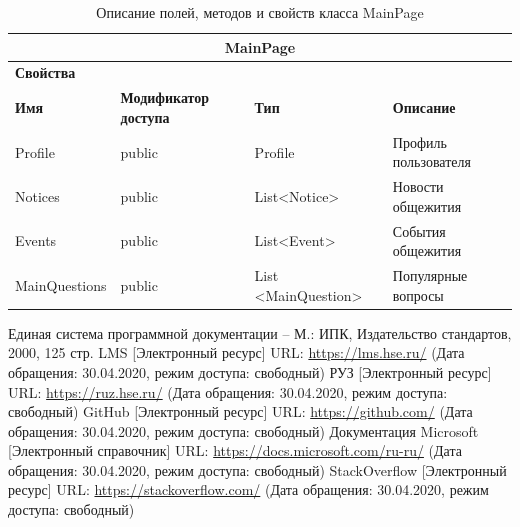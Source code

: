 \documentclass{../includes/TechDoc}
\begin{document}
    \begin{table}[ht]
        \caption{\label{tab:class-mainpagemodel-table}Описание полей, методов и свойств класса MainPage}
        \centering
        \begin{tabular}{|p{3.2cm}|p{3cm}|p{3cm}|p{2.6cm}|p{4cm}|}
            \hline
            \multicolumn{5}{|c|}{MainPage} \\ \hline
            \multicolumn{5}{|l|}{\textbf{Свойства}} \\ \hline
            \textbf{Имя} & \textbf{Модификатор доступа} & \textbf{Тип} & \multicolumn{2}{l|}{\textbf{Описание}} \\ \hline
            Profile & public & Profile & \multicolumn{2}{l|}{Профиль пользователя} \\ \hline
            Notices & public & List<Notice> & \multicolumn{2}{l|}{Новости общежития} \\ \hline
            Events & public & List<Event> & \multicolumn{2}{l|}{События общежития} \\ \hline
            MainQuestions & public & List <MainQuestion> & \multicolumn{2}{l|}{Популярные вопросы} \\ \hline
        \end{tabular}
    \end{table}

    \clearpage

    \begin{thebibliography}{9}
        Единая система программной документации – М.: ИПК, Издательство стандартов, 2000, 125 стр.
         LMS [Электронный ресурс] URL: \url{https://lms.hse.ru/} (Дата обращения: 30.04.2020, режим доступа: свободный)
         РУЗ [Электронный ресурс] URL: \url{https://ruz.hse.ru/} (Дата обращения: 30.04.2020, режим доступа: свободный)
         GitHub [Электронный ресурс] URL: \url{https://github.com/} (Дата обращения: 30.04.2020, режим доступа: свободный)
         Документация Microsoft [Электронный справочник] URL: \url{https://docs.microsoft.com/ru-ru/} (Дата обращения: 30.04.2020, режим доступа: свободный)
         StackOverflow [Электронный ресурс] URL: \url{https://stackoverflow.com/} (Дата обращения: 30.04.2020, режим доступа: свободный)
    \end{thebibliography}


    \registrationList
\end{document}
